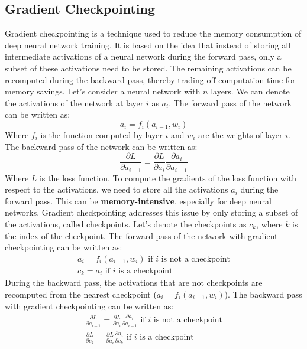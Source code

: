\documentclass{article}
\begin{document}
	\subsection{Gradient Checkpointing}  
	Gradient checkpointing is a technique used to reduce the memory consumption of deep neural network training. 
	It is based on the idea that instead of storing all intermediate activations of a neural network during the forward pass, only a subset of these activations need to be stored.
	The remaining activations can be recomputed during the backward pass, thereby trading off computation time for memory savings.
	Let's consider a neural network with $n$ layers. We can denote the activations of the network at layer $i$ as $a_i$. The forward pass of the network can be written as:
	\begin{equation}
		a_i = f_i(a_{i-1}, w_i)
	\end{equation}
	Where $f_i$ is the function computed by layer $i$ and $w_i$ are the weights of layer $i$.
	The backward pass of the network can be written as:
	\begin{equation}
	\frac{\partial L}{\partial a_{i-1}} = \frac{\partial L}{\partial a_i} \frac{\partial a_i}{\partial a_{i-1}}
	\end{equation}
	Where $L$ is the loss function. To compute the gradients of the loss function with respect to the activations, we need to store all the activations $a_i$ during the forward pass. This can be \textbf{memory-intensive}, especially for deep neural networks.
	Gradient checkpointing addresses this issue by only storing a subset of the activations, called checkpoints. 
	Let's denote the checkpoints as $c_k$, where $k$ is the index of the checkpoint. The forward pass of the network with gradient checkpointing can be written as:
	\begin{gather}
		a_i = f_i(a_{i-1}, w_i) \text{ if $i$ is not a checkpoint} \\
		c_k = a_i \text{ if $i$ is a checkpoint}
	\end{gather}
	During the backward pass, the activations that are not checkpoints are recomputed from the nearest checkpoint ($a_i = f_i(a_{i-1}, w_i)$). The backward pass with gradient checkpointing can be written as:
	\begin{gather}
		\frac{\partial L}{\partial a_{i-1}} = \frac{\partial L}{\partial a_i} \frac{\partial a_i}{\partial a_{i-1}} \text{ if $i$ is not a checkpoint} \\
		\frac{\partial L}{\partial c_k} = \frac{\partial L}{\partial a_i} \frac{\partial a_i}{\partial c_k} \text{ if $i$ is a checkpoint}
	\end{gather}
	
\end{document}
